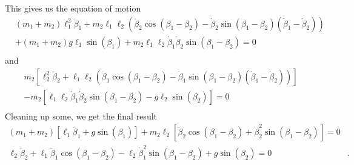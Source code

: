 \documentclass{article}
\begin{document}
        This gives us the equation of motion    
        \begin{align*}
              &(m_1 + m_2) \ell_1^2 \ddot \beta_1 + m_2 \ell_1 \ell_2 \left( \ddot \beta_2 \cos(\beta_1 - \beta_2) - \dot \beta_2 \sin(\beta_1 - \beta_2)(\dot \beta_1 - \dot \beta_2) \right) \\
              &+ (m_1 + m_2) g \ell_1 \sin(\beta_1) + m_2 \ell_1 \ell_2 \dot \beta_1 \dot \beta_2 \sin(\beta_1 - \beta_2) = 0 \\
        \end{align*}
        and 
        \begin{align*}
            & m_2 \left[ \ell_2^2 \ddot \beta_2 + \ell_1 \ell_2 \left(\ddot \beta_1\cos(\beta_1 - \beta_2) - \dot \beta_1 \sin(\beta_1 - \beta_2) (\dot \beta_1 - \dot \beta_2)\right) \right]  \\
            & - m_2 \left[ \ell_1 \ell_2 \dot \beta_1 \dot \beta_2 \sin(\beta_1 - \beta_2)  - g \ell_2 \sin(\beta_2)\right] = 0 \\
        \end{align*}
        Cleaning up some, we get the final result
        \begin{align*}
            (m_1 + m_2) \left[\ell_1 \ddot \beta_1 + g \sin(\beta_1)\right]+ m_2 \ell_2 \left[ \ddot \beta_2 \cos(\beta_1 - \beta_2) + \dot \beta_2^2 \sin(\beta_1 - \beta_2) \right] = 0& \\
            \ell_2 \ddot \beta_2 + \ell_1 \ddot \beta_1 \cos(\beta_1 - \beta_2) - \ell_2 \dot \beta_1^2 \sin(\beta_1 - \beta_2) + g \sin(\beta_2) = 0&.
        \end{align*}
\end{document}

